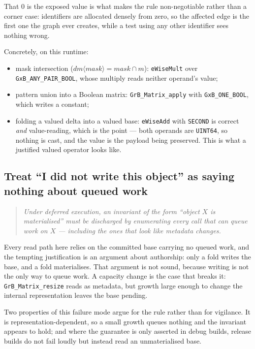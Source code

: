 \documentclass[11pt,a4paper]{article}
\theoremstyle{plain}
\theoremstyle{definition}
\theoremstyle{remark}
\begin{document}
That $0$ is the exposed value is what makes the rule non-negotiable rather than
a corner case: identifiers are allocated densely from zero, so the affected edge
is the first one the graph ever creates, while a test using any other identifier
sees nothing wrong.

Concretely, on this runtime:

\begin{itemize}
\item mask intersection ($dm \mathrel{\langle mask\rangle} = mask \cap m$):
  \texttt{eWiseMult} over \texttt{GxB\_ANY\_PAIR\_BOOL}, whose multiply reads
  neither operand's value;
\item pattern union into a Boolean matrix: \texttt{GrB\_Matrix\_apply} with
  \texttt{GxB\_ONE\_BOOL}, which writes a constant;
\item folding a valued delta into a valued base: \texttt{eWiseAdd} with
  \texttt{SECOND} is correct \emph{and} value-reading, which is the point ---
  both operands are \texttt{UINT64}, so nothing is cast, and the value is the
  payload being preserved. This is what a justified valued operator looks like.
\end{itemize}

\subsection{Treat ``I did not write this object'' as saying nothing about queued work}
\label{sec:hazard-resize}

\begin{quote}
\emph{Under deferred execution, an invariant of the form ``object $X$ is
materialised'' must be discharged by enumerating every call that can queue work
on $X$ --- including the ones that look like metadata changes.}
\end{quote}

Every read path here relies on the committed base carrying no queued work, and
the tempting justification is an argument about authorship: only a fold writes
the base, and a fold materialises. That argument is not sound, because writing
is not the only way to queue work. A capacity change is the case that breaks it:
\texttt{GrB\_Matrix\_resize} reads as metadata, but growth large enough to change
the internal representation leaves the base pending.

Two properties of this failure mode argue for the rule rather than for
vigilance. It is representation-dependent, so a small growth queues nothing and
the invariant appears to hold; and where the guarantee is only asserted in debug
builds, release builds do not fail loudly but instead read an unmaterialised
base.
\end{document}
